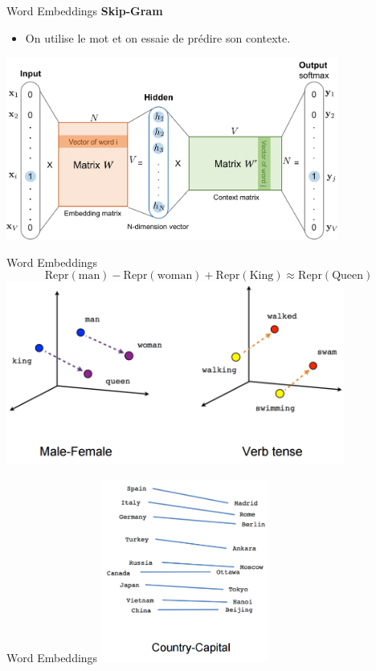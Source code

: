\documentclass[french]{beamer}
\begin{document}
\begin{frame}{Word Embeddings}
\textbf{Skip-Gram}
\begin{itemize}
	\item On utilise le mot et on essaie de prédire son contexte.
\end{itemize}
\centering
\includegraphics[height=6cm]{figures/word2vec-skip-gram.png}
\end{frame}

\begin{frame}{Word Embeddings}
$$ \mathrm{Repr(man)} - \mathrm{Repr(woman)} + \mathrm{Repr(King)} \approx \mathrm{Repr(Queen)} $$
\centering
\includegraphics[height=6cm]{figures/male_female_verb_tense.png}

\end{frame}

\begin{frame}{Word Embeddings}
\centering
\includegraphics[height=6cm]{figures/capital_country.png}

\end{frame}
\end{document}
